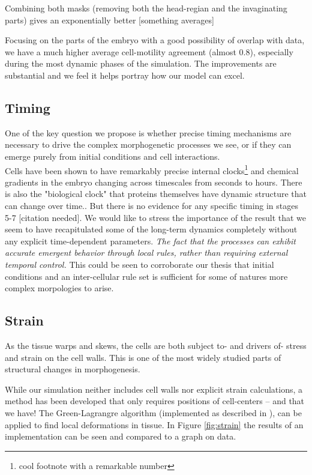 Combining both masks (removing both the head-regian and the  invaginating parts) gives an exponentially better [something averages]


Focusing on the parts of the embryo with a good possibility of overlap with data, we have a much higher average cell-motility agreement (almost 0.8), especially during the most dynamic phases of the simulation. The improvements are substantial and we feel it helps portray how our model can excel.





\subsection{Timing}
One of the key question we propose is whether precise timing mechanisms are necessary to drive the complex morphogenetic processes we see, or if they can emerge purely from initial conditions and cell interactions.\\
Cells have been shown to have remarkably precise internal clocks\footnote{cool footnote with a remarkable number\cite{cellinternal}} and chemical gradients in the embryo changing across timescales from seconds to hours\cite{shvartsman2008dynamics}. There is also the "biological clock"\cite{johanolsen2} that proteins themselves have dynamic structure that can change over time.\cite{johanolsen1}. But there is no evidence for any specific timing in stages 5-7 [citation needed]. We would like to stress the importance of the result that we seem to have recapitulated some of the long-term dynamics completely without any explicit time-dependent parameters. \textit{The fact  that the processes can exhibit accurate emergent behavior through local rules, rather than requiring external temporal control. }This could be seen to corroborate our thesis that initial conditions and an inter-cellular rule set is sufficient for some of natures more complex morpologies to arise. 

\subsection{Strain}
As the tissue warps and skews, the cells are both subject to- and drivers of- stress and strain on the cell walls. This is one of the most widely studied parts of structural changes in morphogenesis.

While our simulation neither includes cell walls nor explicit strain calculations, a method has been developed that only requires positions of cell-centers -- and that we have! The Green-Lagrangre algorithm (implemented as described in ), can be applied to find local deformations in tissue. In Figure \ref{fig:strain} the results of an implementation can be seen and compared to a graph on data.

